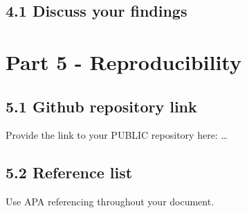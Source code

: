 \documentclass[
]{article}
\begin{document}
\subsection{4.1 Discuss your findings}\label{discuss-your-findings}

\section{Part 5 - Reproducibility}\label{part-5---reproducibility}

\subsection{5.1 Github repository link}\label{github-repository-link}

Provide the link to your PUBLIC repository here: \ldots{}

\subsection{5.2 Reference list}\label{reference-list}

Use APA referencing throughout your document.
\end{document}
